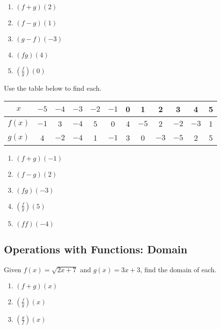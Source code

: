 \begin{multicols}{5}
\begin{enumerate}   \setcounter{enumi}{\value{Review}}  \setlength{\itemsep}{8pt}
    \item $(f + g)(2)$
    \item $(f - g)(1)$
    \item $(g - f)(-3)$
    \item $(fg)(4)$
    \item $\left(\frac{f}{g}\right)(0)$
\end{enumerate} \setcounter{Review}{\value{enumi}}
\end{multicols}

Use the table below to find each.
\begin{center}
\begin{tabular}{c|c|c|c|c|c|c|c|c|c|c|c}

    $x$ & $-5$ & $-4$ & $-3$ & $-2$ & $-1$ & 0 & 1 & 2 & 3 & 4 & 5 \\ \hline 
    $f(x)$ & $-1$ & 3 & $-4$ & 5 & 0 & 4 & $-5$ & 2 & $-2$ & $-3$ & 1 \\ \hline 
    $g(x)$ & 4 & $-2$ & $-4$ & 1 & $-1$ & 3 & 0 & $-3$ & $-5$ & 2 & 5 \\
\end{tabular}
\end{center}
\begin{multicols}{5}
\begin{enumerate}	\setcounter{enumi}{\value{Review}}
\item $(f + g)(-1)$
\item $(f - g)(2)$
\item $(fg)(-3)$
\item $\left(\frac{f}{g}\right)(5)$
\item $(ff)(-4)$
\end{enumerate}	\setcounter{Review}{\value{enumi}}
\end{multicols}

\subsection*{Operations with Functions: Domain}
Given $f(x)=\sqrt{2x+7}$ and $g(x) = 3x+3$, find the domain of each.
\begin{enumerate}
\item $(f + g)(x)$
\item $\left(\frac{f}{g}\right)(x)$
\item $\left(\frac{g}{f}\right)(x)$
\end{enumerate}


